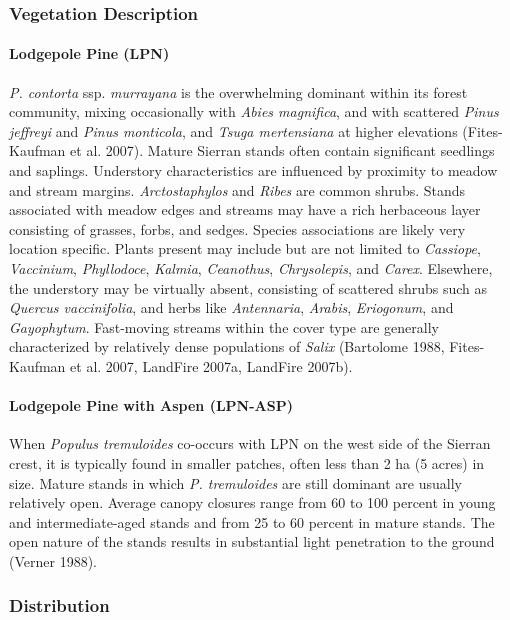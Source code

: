 \subsubsection{Vegetation Description}
\paragraph{Lodgepole Pine (LPN)} \emph{P. contorta} ssp. \emph{murrayana} is the overwhelming dominant within its forest community, mixing occasionally with \emph{Abies magnifica}, and with scattered \emph{Pinus jeffreyi}  and \emph{Pinus monticola}, and \emph{Tsuga mertensiana} at higher elevations (Fites-Kaufman et al. 2007). Mature Sierran stands often contain significant seedlings and saplings. Understory characteristics are influenced by proximity to meadow and stream margins. \emph{Arctostaphylos} and \emph{Ribes} are common shrubs. Stands associated with meadow edges and streams may have a rich herbaceous layer consisting of grasses, forbs, and sedges. Species associations are likely very location specific. Plants present may include but are not limited to \emph{Cassiope}, \emph{Vaccinium}, \emph{Phyllodoce}, \emph{Kalmia}, \emph{Ceanothus}, \emph{Chrysolepis}, and \emph{Carex}. Elsewhere, the understory may be virtually absent, consisting of scattered shrubs such as \emph{Quercus vaccinifolia}, and herbs like \emph{Antennaria}, \emph{Arabis}, \emph{Eriogonum}, and \emph{Gayophytum}. Fast-moving streams within the cover type are generally characterized by relatively dense populations of \emph{Salix} (Bartolome 1988, Fites-Kaufman et al. 2007, LandFire 2007a, LandFire 2007b).  

\paragraph{Lodgepole Pine with Aspen (LPN-ASP)}	When \emph{Populus tremuloides} co-occurs with LPN on the west side of the Sierran crest, it is typically found in smaller patches, often less than 2 ha (5 acres) in size. Mature stands in which \emph{P. tremuloides} are still dominant are usually relatively open. Average canopy closures range from 60 to 100 percent in young and intermediate-aged stands and from 25 to 60 percent in mature stands. The open nature of the stands results in substantial light penetration to the ground (Verner 1988).

\subsubsection{Distribution}
